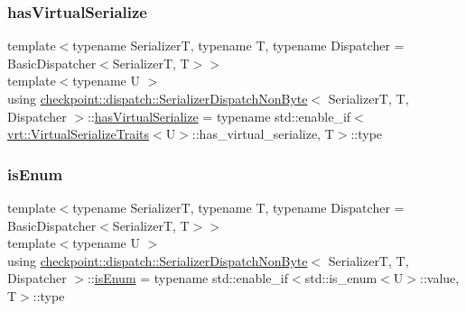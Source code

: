 \mbox{\label{structcheckpoint_1_1dispatch_1_1_serializer_dispatch_non_byte_a51b98addaa52e3e576c48c150aa66583}} 
\subsubsection{\texorpdfstring{has\+Virtual\+Serialize}{hasVirtualSerialize}}
{\footnotesize\ttfamily template$<$typename SerializerT, typename T, typename Dispatcher = Basic\+Dispatcher$<$\+Serializer\+T, T$>$$>$ \\
template$<$typename U $>$ \\
using \hyperlink{structcheckpoint_1_1dispatch_1_1_serializer_dispatch_non_byte}{checkpoint\+::dispatch\+::\+Serializer\+Dispatch\+Non\+Byte}$<$ SerializerT, T, Dispatcher $>$\+::\hyperlink{structcheckpoint_1_1dispatch_1_1_serializer_dispatch_non_byte_a51b98addaa52e3e576c48c150aa66583}{has\+Virtual\+Serialize} =  typename std\+::enable\+\_\+if$<$\hyperlink{structcheckpoint_1_1dispatch_1_1vrt_1_1_virtual_serialize_traits}{vrt\+::\+Virtual\+Serialize\+Traits}$<$U$>$\+::has\+\_\+virtual\+\_\+serialize, T$>$\+::type}

\mbox{\label{structcheckpoint_1_1dispatch_1_1_serializer_dispatch_non_byte_ac47ded9971a3ed3d8d1824d1ff12031a}} 
\subsubsection{\texorpdfstring{is\+Enum}{isEnum}}
{\footnotesize\ttfamily template$<$typename SerializerT, typename T, typename Dispatcher = Basic\+Dispatcher$<$\+Serializer\+T, T$>$$>$ \\
template$<$typename U $>$ \\
using \hyperlink{structcheckpoint_1_1dispatch_1_1_serializer_dispatch_non_byte}{checkpoint\+::dispatch\+::\+Serializer\+Dispatch\+Non\+Byte}$<$ SerializerT, T, Dispatcher $>$\+::\hyperlink{structcheckpoint_1_1dispatch_1_1_serializer_dispatch_non_byte_ac47ded9971a3ed3d8d1824d1ff12031a}{is\+Enum} =  typename std\+::enable\+\_\+if$<$std\+::is\+\_\+enum$<$U$>$\+::value, T$>$\+::type}

